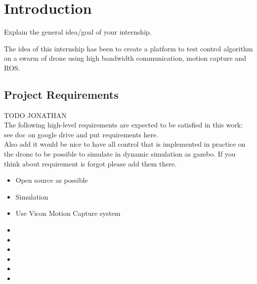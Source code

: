 \chapter{Introduction}
Explain the general idea/goal of your internship.

The idea of this internship has been to create a platform to test control algorithm on a swarm of drone using high bandwidth communication, motion capture and ROS.





\section{Project Requirements}
 {\color{red}TODO JONATHAN\\}
The following high-level requirements are expected to be satisfied in this work: see doc on google drive and put requirements here. \\
Also add it would be nice to have all control that is implemented in practice on the drone to be possible to simulate in dynamic simulation as gazebo. If you think about requirement is forgot please add them there.
\begin{itemize}
    \item Open source as possible
    \item Simulation
    \item Use Vicon Motion Capture system
    \item
    \item
    \item
    \item
    \item
    \item
\end{itemize}
